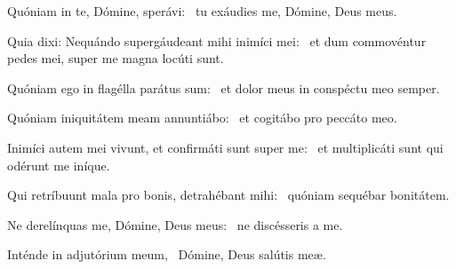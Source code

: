 \item Quóniam in te, Dómine, sperávi:~\psstar{} tu exáudies me, Dómine, Deus meus.

\item Quia dixi: Nequándo supergáudeant mihi inimíci mei:~\psstar{} et dum commovéntur pedes mei, super me magna locúti sunt.

\item Quóniam ego in flagélla parátus sum:~\psstar{} et dolor meus in conspéctu meo semper.

\item Quóniam iniquitátem meam annuntiábo:~\psstar{} et cogitábo pro peccáto meo.

\item Inimíci autem mei vivunt, et confirmáti sunt super me:~\psstar{} et multiplicáti sunt qui odérunt me iníque.

\item Qui retríbuunt mala pro bonis, detrahébant mihi:~\psstar{} quóniam sequébar bonitátem.

\item Ne derelínquas me, Dómine, Deus meus:~\psstar{} ne discésseris a me.

\item Inténde in adjutórium meum,~\psstar{} Dómine, Deus salútis meæ.